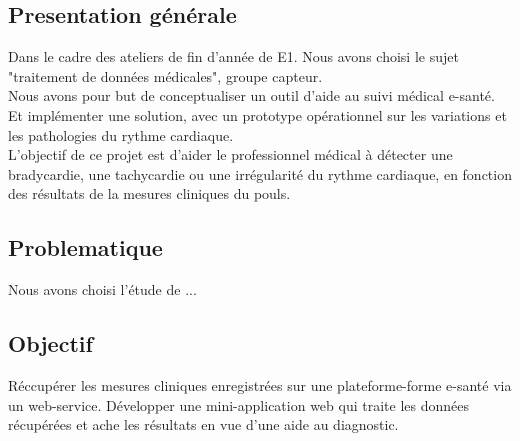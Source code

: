 	\subsection{Presentation générale}
Dans le cadre des ateliers de fin d'année de E1. Nous avons choisi le sujet "traitement de données médicales", groupe capteur. \\
Nous avons pour but de conceptualiser un outil d'aide au suivi médical e-santé. Et implémenter une solution, avec un prototype opérationnel sur les variations et les pathologies du rythme cardiaque.\\
L'objectif de ce projet est d'aider le professionnel médical à détecter une bradycardie, une tachycardie ou une irrégularité du rythme cardiaque, en fonction des résultats de la mesures cliniques du pouls. 

	\subsection{Problematique}
Nous avons choisi l'étude de ...

	\subsection{Objectif}
Réccupérer les mesures cliniques enregistrées sur une plateforme-forme e-santé via un web-service. Développer une mini-application web qui traite les données récupérées et ache les résultats en vue d'une aide au diagnostic.

